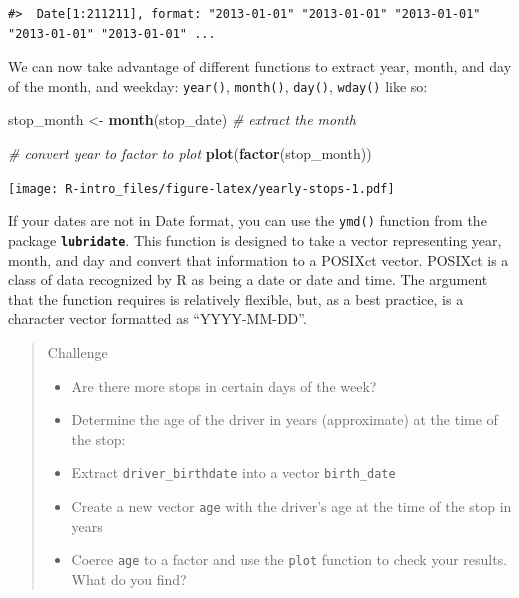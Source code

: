 \documentclass[
]{book}
\newenvironment{Shaded}{\begin{snugshade}}{\end{snugshade}}
\newcommand{\CommentTok}[1]{\textcolor[rgb]{0.56,0.35,0.01}{\textit{#1}}}
\newcommand{\FunctionTok}[1]{\textcolor[rgb]{0.13,0.29,0.53}{\textbf{#1}}}
\newcommand{\NormalTok}[1]{#1}
\newcommand{\OtherTok}[1]{\textcolor[rgb]{0.56,0.35,0.01}{#1}}
\begin{document}
\begin{verbatim}
#>  Date[1:211211], format: "2013-01-01" "2013-01-01" "2013-01-01" "2013-01-01" "2013-01-01" ...
\end{verbatim}

We can now take advantage of different functions to extract year, month, and day of the month, and weekday: \texttt{year()}, \texttt{month()}, \texttt{day()}, \texttt{wday()} like so:

\begin{Shaded}
\begin{Highlighting}[]
\NormalTok{stop\_month }\OtherTok{\textless{}{-}} \FunctionTok{month}\NormalTok{(stop\_date) }\CommentTok{\# extract the month}

\CommentTok{\# convert year to factor to plot}
\FunctionTok{plot}\NormalTok{(}\FunctionTok{factor}\NormalTok{(stop\_month)) }
\end{Highlighting}
\end{Shaded}

\texttt{[image: R-intro\_files/figure-latex/yearly-stops-1.pdf]}

If your dates are not in Date format, you can use the \texttt{ymd()} function from the package \textbf{\texttt{lubridate}}. This
function is designed to take a vector representing year, month, and day and convert
that information to a POSIXct vector. POSIXct is a class of data recognized by R as
being a date or date and time. The argument that the function requires is relatively
flexible, but, as a best practice, is a character vector formatted as ``YYYY-MM-DD''.

\begin{quote}
Challenge

\begin{itemize}
\item
  Are there more stops in certain days of the week?
\item
  Determine the age of the driver in years (approximate) at the time of the stop:
\item
  Extract \texttt{driver\_birthdate} into a vector \texttt{birth\_date}
\item
  Create a new vector \texttt{age} with the driver's age at the time of the stop in years
\item
  Coerce \texttt{age} to a factor and use the \texttt{plot} function to check your results. What do you find?
\end{itemize}
\end{quote}

  
\end{document}
